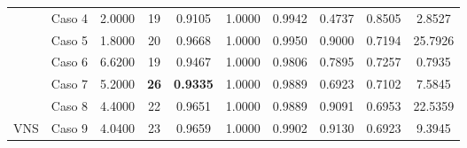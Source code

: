 \begin{table}
{\begin{tabular}{cccccccccc}
			\multicolumn{1}{c|}{}                      & {\color[HTML]{003532} Caso 4} & {\color[HTML]{003532} 2.0000}                                        & {\color[HTML]{003532} 19}                                          & {\color[HTML]{003532} 0.9105}                           & {\color[HTML]{003532} 1.0000} & {\color[HTML]{003532} 0.9942} & {\color[HTML]{003532} 0.4737} & {\color[HTML]{003532} 0.8505} & {\color[HTML]{003532} 2.8527}                                        \\
			\multicolumn{1}{c|}{}                      & Caso 5                        & 1.8000                                                               & 20                                                                 & 0.9668                                                  & 1.0000                        & 0.9950                        & 0.9000                        & 0.7194                        & 25.7926                                                              \\
			\multicolumn{1}{c|}{}                      & {\color[HTML]{003532} Caso 6} & {\color[HTML]{003532} 6.6200}                                        & {\color[HTML]{003532} 19}                                          & {\color[HTML]{003532} 0.9467}                           & {\color[HTML]{003532} 1.0000} & {\color[HTML]{003532} 0.9806} & {\color[HTML]{003532} 0.7895} & {\color[HTML]{003532} 0.7257} & {\color[HTML]{003532} 0.7935}                                        \\
			\multicolumn{1}{c|}{}                      & Caso 7                        & 5.2000                                                               & {\color[HTML]{9A0000} \textbf{26}}                                 & {\color[HTML]{9A0000} \textbf{0.9335}}                  & 1.0000                        & 0.9889                        & 0.6923                        & 0.7102                        & 7.5845                                                               \\
			\multicolumn{1}{c|}{}                      & {\color[HTML]{003532} Caso 8} & {\color[HTML]{003532} 4.4000}                                        & {\color[HTML]{003532} 22}                                          & {\color[HTML]{003532} 0.9651}                           & {\color[HTML]{003532} 1.0000} & {\color[HTML]{003532} 0.9889} & {\color[HTML]{003532} 0.9091} & {\color[HTML]{003532} 0.6953} & {\color[HTML]{003532} 22.5359}                                       \\
			\multicolumn{1}{c|}{\multirow{-8}{*}{VNS}} & Caso 9                        & 4.0400                                                               & 23                                                                 & 0.9659                                                  & 1.0000                        & 0.9902                        & 0.9130                        & 0.6923                        & 9.3945                                                               \\

\end{tabular}}
\end{table}
